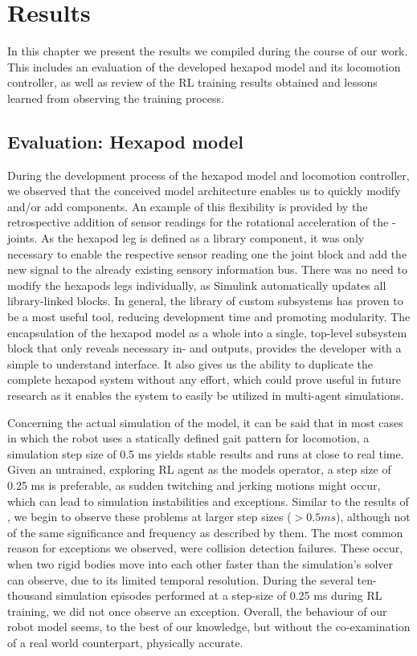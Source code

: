 \chapter{Results}
\label{ch:results}

In this chapter we present the results we compiled during the course of our work.
This includes an evaluation of the developed hexapod model and its locomotion controller, as well as review of the RL training results obtained and lessons learned from observing the training process.

\section{Evaluation: Hexapod model}
During the development process of the hexapod model and locomotion controller, we observed that the conceived model architecture enables us to quickly modify and/or add components.
An example of this flexibility is provided by the retrospective addition of sensor readings for the rotational acceleration of the \textalpha-joints.
As the hexapod leg is defined as a library component, it was only necessary to enable the respective sensor reading one the joint block and add the new signal to the already existing sensory information bus. 
There was no need to modify the hexapods legs individually, as Simulink automatically updates all library-linked blocks.
In general, the library of custom subsystems has proven to be a most useful tool, reducing development time and promoting modularity.
The encapsulation of the hexapod model as a whole into a single, top-level subsystem block that only reveals necessary in- and outputs, provides the developer with a simple to understand interface.
It also gives us the ability to duplicate the complete hexapod system without any effort, which could prove useful in future research as it enables the system to easily be utilized in multi-agent simulations.

Concerning the actual simulation of the model, it can be said that in most cases in which the robot uses a statically defined gait pattern for locomotion, a simulation step size of 0.5 ms yields stable results and runs at close to real time.
Given an untrained, exploring RL agent as the models operator, a step size of 0.25 ms is preferable, as sudden twitching and jerking motions might occur, which can lead to simulation instabilities and exceptions.
Similar to the results of \cite{thilderkvist2015motion}, we begin to observe these problems at larger step sizes ($> 0.5 ms$), although not of the same significance and frequency as described by them. 
The most common reason for exceptions we observed, were collision detection failures.
These occur, when two rigid bodies move into each other faster than the simulation's solver can observe, due to its limited temporal resolution.
During the several ten-thousand simulation episodes performed at a step-size of 0.25 ms during RL training, we did not once observe an exception.
Overall, the behaviour of our robot model seems, to the best of our knowledge, but without the co-examination of a real world counterpart, physically accurate.


